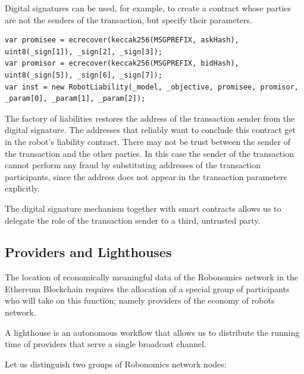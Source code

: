 \documentclass{article}
\begin{document}
Digital signatures can be used, for example, to create a contract whose parties are not the senders of the transaction, but specify their parameters.

\begin{lstlisting}
var promisee = ecrecover(keccak256(MSGPREFIX, askHash), uint8(_sign[1]), _sign[2], _sign[3]);
var promisor = ecrecover(keccak256(MSGPREFIX, bidHash), uint8(_sign[5]), _sign[6], _sign[7]);
var inst = new RobotLiability(_model, _objective, promisee, promisor, _param[0], _param[1], _param[2]);
\end{lstlisting}

The factory of liabilities restores the address of the transaction sender from the digital signature. The addresses that reliably want to conclude this contract get in the robot's liability contract. There may not be trust between the sender of the transaction and the other parties. In this case the sender of the transaction cannot perform any fraud by substituting addresses of the transaction participants, since the address does not appear in the transaction parameters explicitly.

The digital signature mechanism together with smart contracts allows us to delegate the role of the transaction sender to a third, untrusted party.

\subsection{Providers and Lighthouses}

The location of economically meaningful data of the Robonomics network in the Ethereum Blockchain requires the allocation of a special group of participants who will take on this function; namely providers of the economy of robots network.

A lighthouse is an autonomous workflow that allows us to distribute the running time of providers that serve a single broadcast channel.

Let us distinguish two groups of Robonomics network nodes:
\end{document}
